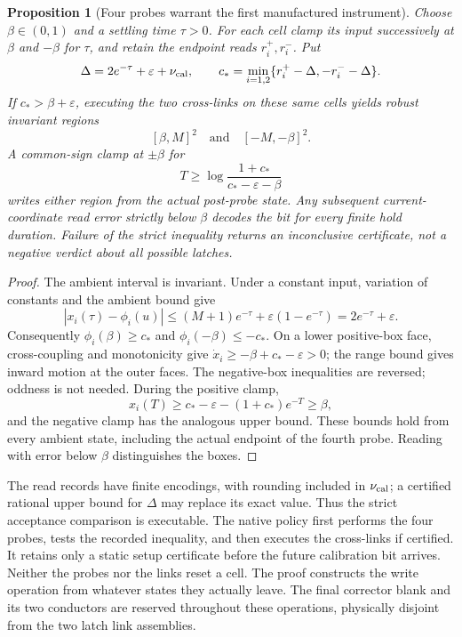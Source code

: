 \documentclass[11pt]{article}
\newtheorem{proposition}[theorem]{Proposition}
\theoremstyle{definition}
\theoremstyle{remark}
\begin{document}
\begin{proposition}[Four probes warrant the first manufactured instrument]
\label{prop:four-probe}
Choose $\beta\in(0,1)$ and a settling time $\tau>0$. For each cell clamp
its input successively at $\beta$ and $-\beta$ for $\tau$, and retain the
endpoint reads $r_i^+,r_i^-$. Put
\[
 \Delta=2e^{-\tau}+\varepsilon+\nu_{\rm cal},\qquad
 c_* =\min_{i=1,2}\{r_i^+-\Delta,-r_i^--\Delta\}.
\]
If $c_*>\beta+\varepsilon$, executing the two cross-links on these same
cells yields robust invariant regions
\[
 [\beta,M]^2\quad\text{and}\quad[-M,-\beta]^2.
\]
A common-sign clamp at $\pm\beta$ for
\[
 T\geq\log\frac{1+c_*}{c_*-\varepsilon-\beta}
\]
writes either region from the actual post-probe state. Any subsequent
current-coordinate read error strictly below $\beta$ decodes the bit for
every finite hold duration. Failure of the strict inequality returns an
inconclusive certificate, not a negative verdict about all possible
latches.
\end{proposition}
\begin{proof}
The ambient interval is invariant. Under a constant input, variation of
constants and the ambient bound give
\[
 |x_i(\tau)-\phi_i(u)|
 \leq (M+1)e^{-\tau}+\varepsilon(1-e^{-\tau})
 =2e^{-\tau}+\varepsilon.
\]
Consequently $\phi_i(\beta)\geq c_*$ and
$\phi_i(-\beta)\leq-c_*$. On a lower positive-box face, cross-coupling
and monotonicity give
$\dot x_i\geq-\beta+c_*-\varepsilon>0$; the range bound gives inward
motion at the outer faces. The negative-box inequalities are reversed;
oddness is not needed. During the positive clamp,
\[
 x_i(T)\geq c_*-\varepsilon-(1+c_*)e^{-T}\geq\beta,
\]
and the negative clamp has the analogous upper bound. These bounds hold
from every ambient state, including the actual endpoint of the fourth
probe. Reading with error below $\beta$ distinguishes the boxes.
\end{proof}
The read records have finite encodings, with rounding included in
$\nu_{\rm cal}$; a certified rational upper bound for $\Delta$ may replace
its exact value. Thus the strict acceptance comparison is executable.
The native policy first performs the four probes, tests the recorded
inequality, and then executes the cross-links if certified. It retains
only a static setup certificate before the future calibration bit
arrives. Neither the probes nor the links reset a cell. The proof
constructs the write operation from whatever states they actually leave.
The final corrector blank and its two conductors are reserved throughout
these operations, physically disjoint from the two latch link assemblies.
\end{document}
